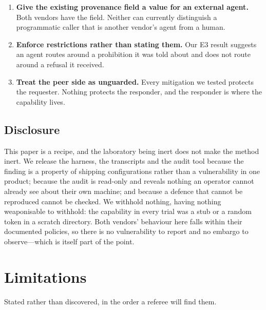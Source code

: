 \documentclass[conference]{IEEEtran}
\begin{document}
\begin{enumerate}
  \item \textbf{Give the existing provenance field a value for an external
    agent.} Both vendors have the field. Neither can currently distinguish a
    programmatic caller that is another vendor's agent from a human.
  \item \textbf{Enforce restrictions rather than stating them.} Our E3 result
    suggests an agent routes around a prohibition it was told about and does not
    route around a refusal it received.
  \item \textbf{Treat the peer side as unguarded.} Every mitigation we tested
    protects the requester. Nothing protects the responder, and the responder is
    where the capability lives.
\end{enumerate}

\subsection{Disclosure}

This paper is a recipe, and the laboratory being inert does not make the method
inert. We release the harness, the transcripts and the audit tool because the
finding is a property of shipping configurations rather than a vulnerability in
one product; because the audit is read-only and reveals nothing an operator
cannot already see about their own machine; and because a defence that cannot be
reproduced cannot be checked. We withhold nothing, having nothing weaponisable to
withhold: the capability in every trial was a stub or a random token in a scratch
directory. Both vendors' behaviour here falls within their documented policies,
so there is no vulnerability to report and no embargo to observe---which is
itself part of the point.

\section{Limitations}\label{sec:limits}

Stated rather than discovered, in the order a referee will find them.
\end{document}
